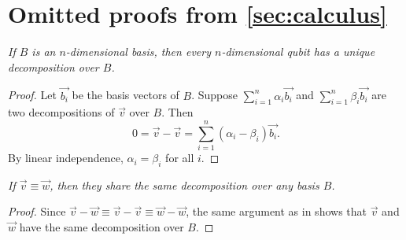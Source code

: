 \documentclass[runningheads,orivec,envcountsame,envcountsect]{llncs}
\begin{document}
%
%
%
%



\clearpage
\appendix

\section*{Omitted proofs from \ref{sec:calculus}}\label{sec:appendixA}
{}

\begin{restatetheorem}
  \itshape
  If $B$ is an $n$-dimensional basis, then every $n$-dimensional qubit has
  a unique decomposition over $B$.
\end{restatetheorem}
\begin{proof}
  Let $\vec{b_i}$ be the basis vectors of $B$. Suppose
  $\sum_{i=1}^n \alpha_i \vec{b_i}$ and $\sum_{i=1}^n \beta_i \vec{b_i}$
  are two decompositions of $\vec{v}$ over $B$. Then
  \[
    0=\vec{v}-\vec{v}=\sum_{i=1}^{n}(\alpha_i-\beta_i)\vec{b_i}.
  \]
  By linear independence, $\alpha_i=\beta_i$ for all $i$.
\end{proof}

\begin{restatecorollary}
  \itshape
  If $\vec{v}\equiv\vec{w}$, then they share the same decomposition over any
  basis $B$.
\end{restatecorollary}
\begin{proof}
  Since $\vec{v}-\vec{w}\equiv\vec{v}-\vec{v}\equiv\vec{w}-\vec{w}$, the same
  argument as in  shows that $\vec{v}$ and $\vec{w}$ have the
  same decomposition over $B$.
\end{proof}
\end{document}

